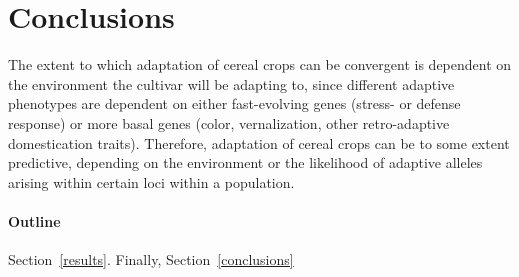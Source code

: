 \documentclass[12pt]{article}
\begin{document}
\section{Conclusions}
The extent to which adaptation of cereal crops can be convergent is dependent on the environment the cultivar will be adapting to, since different adaptive phenotypes are dependent on either fast-evolving genes (stress- or defense response) or more basal genes (color, vernalization, other retro-adaptive domestication traits).
Therefore, adaptation of cereal crops can be to some extent predictive, depending on the environment or the likelihood of adaptive alleles arising within certain loci within a population. 

\paragraph{Outline}
 Section~\ref{results}.
Finally, Section~\ref{conclusions} 





\end{document}
